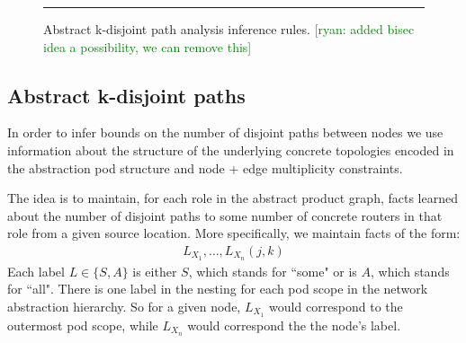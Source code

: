 \documentclass{sig-alternate-10pt}
\newcommand{\ryan}[1]{\textcolor{green}{[ryan: #1]}}
\begin{document}
\begin{figure}[t!]
  \begin{minipage}[t]{\linewidth}%
  \end{minipage}

  \vspace*{1em}
  \begin{minipage}[t]{\linewidth}%
  \end{minipage}

  \vspace*{1em}
  \begin{minipage}[t]{\linewidth}%
  \end{minipage}

  \hrule
  \vspace*{1em}
  \caption{Abstract k-disjoint path analysis inference rules. \ryan{added bisec idea a possibility, we can remove this}}
  \label{fig:inference-rules}
\end{figure}


\subsection{Abstract k-disjoint paths}
\label{sec:property-checking}

In order to infer bounds on the number of disjoint paths between nodes we use information about the structure of the underlying concrete topologies encoded in the abstraction pod structure and node + edge multiplicity constraints.

The idea is to maintain, for each role in the abstract product graph, facts learned about the number of disjoint paths to some number of concrete routers in that role from a given source location. More specifically, we maintain facts of the form:
%
\[ \begin{array}{c}
  L_{X_1}, \ldots, L_{X_n}(j,k)
\end{array} \]
\noindent
%
Each label $L \in \{S,A\}$ is either $S$, which stands for ``some" or is $A$, which stands for ``all". There is one label in the nesting for each pod scope in the network abstraction hierarchy. So for a given node, $L_{X_1}$ would correspond to the outermost pod scope, while $L_{X_n}$ would correspond the the node's label.
\end{document}
